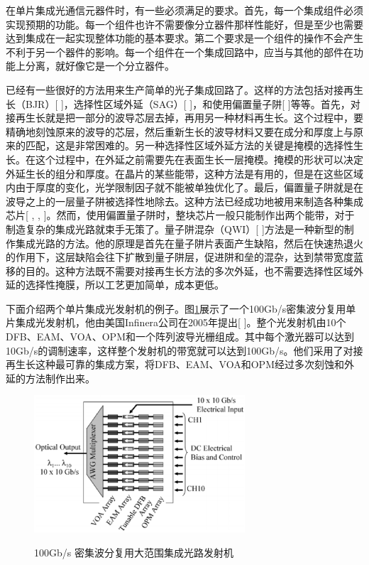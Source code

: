 \documentclass{ZJUthesis}
\begin{document}
在单片集成光通信元器件时，有一些必须满足的要求。首先，每一个集成组件必须实现预期的功能。每一个组件也许不需要像分立器件那样性能好，但是至少也需要达到集成在一起实现整体功能的基本要求。第二个要求是一个组件的操作不会产生不利于另一个器件的影响。每一个组件在一个集成回路中，应当与其他的部件在功能上分离，就好像它是一个分立器件。

已经有一些很好的方法用来生产简单的光子集成回路了。这样的方法包括对接再生长（BJR）[ ]，选择性区域外延（SAG）[ ]，和使用偏置量子阱[ ]等等。首先，对接再生长就是把一部分的波导芯层去掉，再用另一种材料再生长。这个过程中，要精确地刻蚀原来的波导的芯层，然后重新生长的波导材料又要在成分和厚度上与原来的匹配，这是非常困难的。另一种选择性区域外延方法的关键是掩模的选择性生长。在这个过程中，在外延之前需要先在表面生长一层掩模。掩模的形状可以决定外延生长的组分和厚度。在晶片的某些能带，这种方法是有用的，但是在这些区域内由于厚度的变化，光学限制因子就不能被单独优化了。最后，偏置量子阱就是在波导之上的一层量子阱被选择性地除去。这种方法已经成功地被用来制造各种集成芯片[ , , ]。然而，使用偏置量子阱时，整块芯片一般只能制作出两个能带，对于制造复杂的集成光路就束手无策了。量子阱混杂（QWI）[ ]方法是一种新型的制作集成光路的方法。他的原理是首先在量子阱片表面产生缺陷，然后在快速热退火的作用下，这层缺陷会往下扩散到量子阱层，促进阱和垒的混杂，达到禁带宽度蓝移的目的。这种方法既不需要对接再生长方法的多次外延，也不需要选择性区域外延的选择性掩膜，所以工艺更加简单，成本更低。

下面介绍两个单片集成光发射机的例子。图\ref{fig_infinera}展示了一个100Gb/s密集波分复用单片集成光发射机，他由美国Infinera公司在2005年提出[ ]。整个光发射机由10个DFB、EAM、VOA、OPM和一个阵列波导光栅组成。其中每个激光器可以达到10Gb/s的调制速率，这样整个发射机的带宽就可以达到100Gb/s。他们采用了对接再生长这种最可靠的集成方案，将DFB、EAM、VOA和OPM经过多次刻蚀和外延的方法制作出来。

\begin{figure}[!ht]
  \centering
  \includegraphics[width=0.7\textwidth]{./Pictures/infinera.eps}\\
  \caption{100Gb/s 密集波分复用大范围集成光路发射机}
  \label{fig_infinera}
\end{figure}
\end{document}
